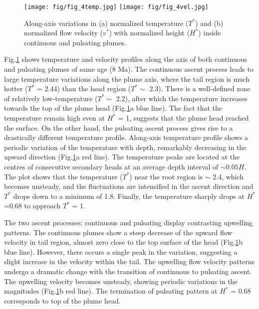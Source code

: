 \documentclass[12pt]{article}
\begin{document}
{%
\begin{figure}[!htb]
 \begin{center}
{\texttt{[image: fig/fig\_4temp.jpg]} }
{\texttt{[image: fig/fig\_4vel.jpg]} }
\caption{ \small {Along-axis variations in (a) normalized temperature ($T^*$) and (b) normalized flow velocity ($v^*$) with normalized height ($H^*$) inside continuous and pulsating plumes. }}
\label{fig:fig4}
 \end{center}
\end{figure}


 
Fig.\ref{fig:fig4} shows temperature and velocity profiles along the axis of both continuous and pulsating plumes of same age (8 Ma). The continuous ascent process leads to large temperature variations along the plume axis, where the tail region is much hotter ($T^*$ = 2.44) than the head region ($T^* \sim$ 2.3). There is a well-defined zone of relatively low-temperature ($T^* \sim$ 2.2), after which the temperature increases towards the top of the plume head (Fig.\ref{fig:fig4}a blue line). The fact that the temperature remain high even at $H^*$ = 1, suggests that the plume head reached the surface.  On the other hand, the pulsating ascent process gives rise to a drastically different temperature profile. Along-axis temperature profile shows a periodic variation of the temperature with depth, remarkably decreasing in the upward direction 
(Fig.\ref{fig:fig4}a red line). The temperature peaks are located at the centres of consecutive secondary heads at an average depth interval of $\sim 0.05 H$. The plot shows that the temperature ($T^*$) near the root 
region is $\sim$ 2.4, which becomes unsteady, and the fluctuations are intensified in the ascent direction and $T^*$ drops down to a minimum of 1.8. Finally, the temperature sharply drops at $H^*$ =0.68 to approach $T^*$ = 1. 
	
	
	
The two ascent processes: continuous and pulsating display contrasting upwelling patterns. The continuous plumes show a steep decrease of the upward flow velocity in tail region, almost zero close to the top surface of the head (Fig.\ref{fig:fig4}b blue line). However, there occurs a single peak in the variation, suggesting a slight increase in the velocity within the tail.  The upwelling flow velocity patterns undergo a dramatic change with the transition of continuous to pulsating ascent. The upwelling velocity becomes unsteady, showing periodic variations in 
the magnitudes (Fig.\ref{fig:fig4}b red line). The termination of pulsating pattern at $H^*$ = 0.68 corresponds to top of the plume head.
	


}
\end{document}
